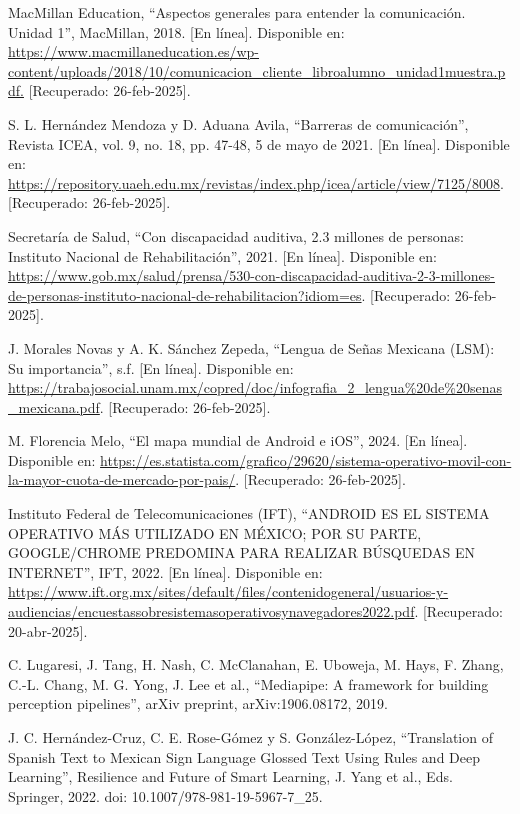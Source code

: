 \begin{thebibliography}{99}
    MacMillan Education, “Aspectos generales para entender la comunicación. Unidad 1”, MacMillan, 2018. [En línea]. Disponible en: \url{https://www.macmillaneducation.es/wp-content/uploads/2018/10/comunicacion_cliente_libroalumno_unidad1muestra.pdf.} [Recuperado: 26-feb-2025].

    S. L. Hernández Mendoza y D. Aduana Avila, “Barreras de comunicación”, Revista ICEA, vol. 9, no. 18, pp. 47-48, 5 de mayo de 2021. [En línea]. Disponible en: \url{https://repository.uaeh.edu.mx/revistas/index.php/icea/article/view/7125/8008}. [Recuperado: 26-feb-2025].

    Secretaría de Salud, “Con discapacidad auditiva, 2.3 millones de personas: Instituto Nacional de Rehabilitación”, 2021. [En línea]. Disponible en: \url{https://www.gob.mx/salud/prensa/530-con-discapacidad-auditiva-2-3-millones-de-personas-instituto-nacional-de-rehabilitacion?idiom=es}. [Recuperado: 26-feb-2025].

    J. Morales Novas y A. K. Sánchez Zepeda, “Lengua de Señas Mexicana (LSM): Su importancia”, s.f. [En línea]. Disponible en: \url{https://trabajosocial.unam.mx/copred/doc/infografia_2_lengua%20de%20senas_mexicana.pdf}. [Recuperado: 26-feb-2025].

    M. Florencia Melo, “El mapa mundial de Android e iOS”, 2024. [En línea]. Disponible en: \url{https://es.statista.com/grafico/29620/sistema-operativo-movil-con-la-mayor-cuota-de-mercado-por-pais/}. [Recuperado: 26-feb-2025].

    Instituto Federal de Telecomunicaciones (IFT), “ANDROID ES EL SISTEMA OPERATIVO MÁS UTILIZADO EN MÉXICO; POR SU PARTE, GOOGLE/CHROME PREDOMINA PARA REALIZAR BÚSQUEDAS EN INTERNET”, IFT, 2022. [En línea]. Disponible en: \url{https://www.ift.org.mx/sites/default/files/contenidogeneral/usuarios-y-audiencias/encuestassobresistemasoperativosynavegadores2022.pdf}. [Recuperado: 20-abr-2025].

    C. Lugaresi, J. Tang, H. Nash, C. McClanahan, E. Uboweja, M. Hays, F. Zhang, C.-L. Chang, M. G. Yong, J. Lee et al., “Mediapipe: A framework for building perception pipelines”, arXiv preprint, arXiv:1906.08172, 2019.

    J. C. Hernández-Cruz, C. E. Rose-Gómez y S. González-López, “Translation of Spanish Text to Mexican Sign Language Glossed Text Using Rules and Deep Learning”, Resilience and Future of Smart Learning, J. Yang et al., Eds. Springer, 2022. doi: 10.1007/978-981-19-5967-7\_25.


\end{thebibliography}

